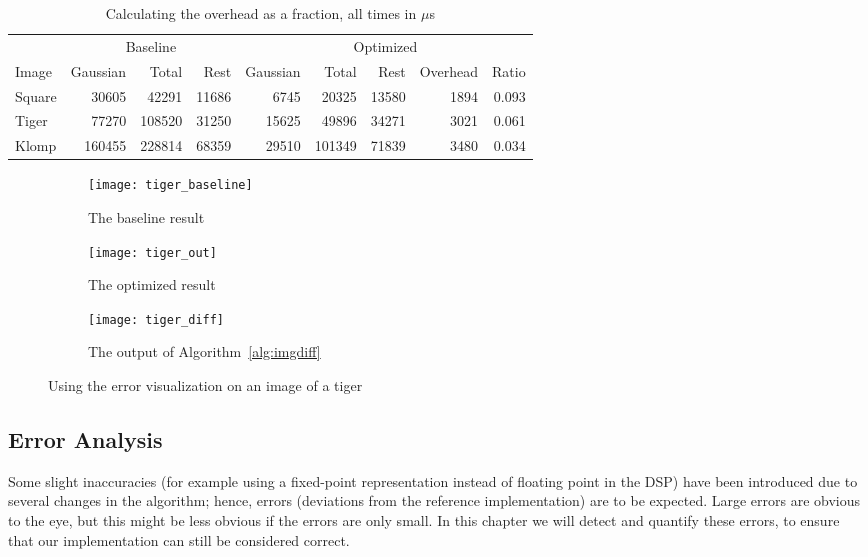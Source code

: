 \begin{table*}
\centering
\begin{tabular}{l | r r r | r r r r r}
        & \multicolumn{3}{|c|}{Baseline}    & \multicolumn{5}{|c}{Optimized}                        \\
Image   & Gaussian  & Total     & Rest      & Gaussian  & Total     & Rest  & Overhead  & Ratio     \\
\hline
Square  & 30605     & 42291     & 11686     & 6745      & 20325     & 13580 & 1894      & 0.093     \\
Tiger   & 77270     & 108520    & 31250     & 15625     & 49896     & 34271 & 3021      & 0.061     \\
Klomp   & 160455    & 228814    & 68359     & 29510     & 101349    & 71839 & 3480      & 0.034     \\
\end{tabular}
\caption{Calculating the overhead as a fraction, all times in $\mu$s}
\label{tab:overhead}
\end{table*}


\begin{figure*}
    \centering
    \begin{subfigure}[b]{0.3\textwidth}
            \texttt{[image: tiger\_baseline]}
            \caption{The baseline result}
            \label{fig:er_tiger_baseline}
    \end{subfigure}
    \begin{subfigure}[b]{0.3\textwidth}
            \texttt{[image: tiger\_out]}
            \caption{The optimized result}
            \label{fig:er_tiger_out}
    \end{subfigure}
    \begin{subfigure}[b]{0.3\textwidth}
            \texttt{[image: tiger\_diff]}
            \caption{The output of Algorithm~\ref{alg:imgdiff}}
            \label{fig:er_tiger_diff}
    \end{subfigure}
    \caption{Using the error visualization on an image of a tiger}
    \label{fig:imgdiff}
\end{figure*}

\subsection{Error Analysis}
Some slight inaccuracies (for example using a fixed-point representation instead of floating point in the DSP) have been introduced due to several changes in the algorithm; hence, errors (deviations from the reference implementation) are to be expected. 
Large errors are obvious to the eye, but this might be less obvious if the errors are only small. In this chapter we will detect and quantify these errors, to ensure that our implementation can still be considered correct.

